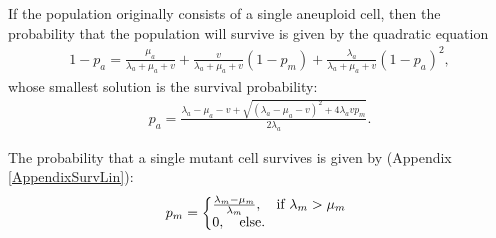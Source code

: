 \documentclass[12pt]{extarticle}
\begin{document}
If the population originally consists of a single aneuploid cell, then the probability that the population will survive is given by the quadratic equation
\begin{align}
1-p_a=\frac{\mu_a}{\lambda_a+\mu_a+v}+\frac{v}{\lambda_a+\mu_a+v}\left(1-p_m\right)+\frac{\lambda_a}{\lambda_a+\mu_a+v}\left(1-p_a\right)^2,
\end{align}
whose smallest solution is the survival probability:
\begin{align}\label{survproba}
p_a=\frac{\lambda_a-\mu_a-v+\sqrt{\left(\lambda_a-\mu_a-v\right)^2+4\lambda_avp_m}}{2\lambda_a}.
\end{align}

The probability that a single mutant cell survives is given by (Appendix \ref{AppendixSurvLin}):
\begin{equation}
p_m = \left\{
  \begin{array}{@{}ll@{}}
  \frac{\lambda_m-\mu_m}{\lambda_m},\quad \text{if }\lambda_m>\mu_m \\
   0,\quad \text{else} .
  \end{array}\right .
\end{equation}

\end{document}
